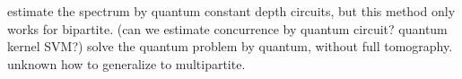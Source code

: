 \documentclass[
reprint,
aps,
pra,
floatfix,
]{revtex4-2}
\theoremstyle{plain}
\newtheorem{theorem}{Theorem}
\theoremstyle{definition}
\newcommand{\dm}{\rho}
\begin{document}
estimate the spectrum by quantum constant depth circuits, but this method only works for bipartite.
(can we estimate concurrence by quantum circuit? quantum kernel SVM?)
solve the quantum problem by quantum, without full tomography.
unknown how to generalize to multipartite.

\end{document}
